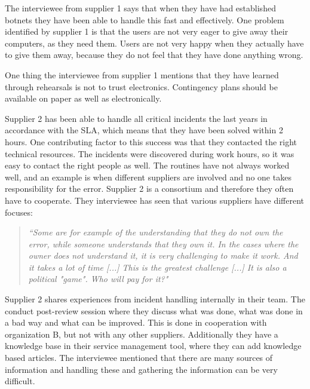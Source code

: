 The interviewee from supplier 1 says that when they have had established botnets they have been able to handle this fast and effectively. One problem identified by supplier 1 is that the users are not very eager to give away their computers, as they need them. Users are not very happy when they actually have to give them away, because they do not feel that they have done anything wrong.

One thing the interviewee from supplier 1 mentions that they have learned through rehearsals is not to trust electronics. Contingency plans should be available on paper as well as electronically.

Supplier 2 has been able to handle all critical incidents the last years in accordance with the \ac{SLA}, which means that they have been solved within 2 hours. One contributing factor to this success was that they contacted the right technical resources. The incidents were discovered during work hours, so it was easy to contact the right people as well. The routines have not always worked well, and an example is when different suppliers are involved and no one takes responsibility for the error. Supplier 2 is a consortium and therefore they often have to cooperate. They interviewee has seen that various suppliers have different focuses:

\begin{quote}
\textit{``Some are for example of the understanding that they do not own the error, while someone understands that they own it. In the cases where the owner does not understand it, it is very challenging to make it work. And it takes a lot of time [...] This is the greatest challenge [...] It is also a political "game". Who will pay for it?"}
\end{quote}

Supplier 2 shares experiences from incident handling internally in their team. The conduct post-review session where they discuss what was done, what was done in a bad way and what can be improved. This is done in cooperation with organization B, but not with any other suppliers. Additionally they have a knowledge base in their service management tool, where they can add knowledge based articles. The interviewee mentioned that there are many sources of information and handling these and gathering the information can be very difficult.